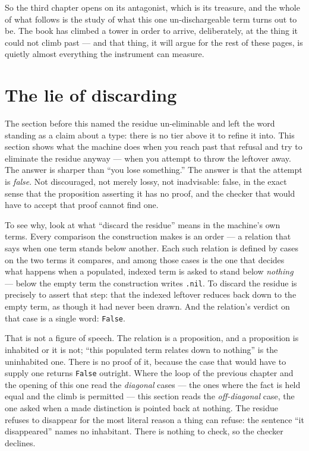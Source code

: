 So the third chapter opens on its antagonist, which is its treasure, and the whole of what follows is the study of
what this one un-dischargeable term turns out to be. The book has climbed a tower in order to arrive, deliberately, at
the thing it could not climb past --- and that thing, it will argue for the rest of these pages, is quietly almost
everything the instrument can measure.

\section{The lie of discarding}

The section before this named the residue un-eliminable and left the word standing as a claim about a type: there is
no tier above it to refine it into. This section shows what the machine does when you reach past that refusal and try
to eliminate the residue anyway --- when you attempt to throw the leftover away. The answer is sharper than ``you lose
something.'' The answer is that the attempt is \emph{false}. Not discouraged, not merely lossy, not inadvisable:
false, in the exact sense that the proposition asserting it has no proof, and the checker that would have to accept
that proof cannot find one.

To see why, look at what ``discard the residue'' means in the machine's own terms. Every comparison the construction
makes is an order --- a relation that says when one term stands below another. Each such relation is defined by cases
on the two terms it compares, and among those cases is the one that decides what happens when a populated, indexed
term is asked to stand below \emph{nothing} --- below the empty term the construction writes \verb|.nil|. To discard
the residue is precisely to assert that step: that the indexed leftover reduces back down to the empty term, as though
it had never been drawn. And the relation's verdict on that case is a single word: \verb|False|.

That is not a figure of speech. The relation is a proposition, and a proposition is inhabited or it is not; ``this
populated term relates down to nothing'' is the uninhabited one. There is no proof of it, because the case that would
have to supply one returns \verb|False| outright. Where the loop of the previous chapter and the opening of this one
read the \emph{diagonal} cases --- the ones where the fact is held equal and the climb is permitted --- this section
reads the \emph{off-diagonal} case, the one asked when a made distinction is pointed back at nothing. The residue
refuses to disappear for the most literal reason a thing can refuse: the sentence ``it disappeared'' names no
inhabitant. There is nothing to check, so the checker declines.

